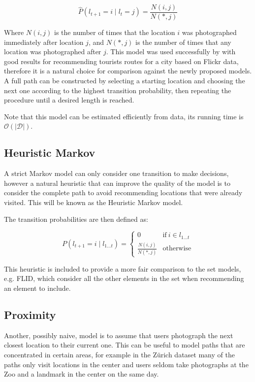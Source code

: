 \begin{equation}
  \hat{P}(l_{t+1} = i \mid l_{t} = j) = \frac{N(i,j)}{N(*,j)}
\end{equation}

Where $N(i,j)$ is the number of times that the location $i$ was photographed immediately after location $j$, and $N(*, j)$ is the number of times that any location was photographed after $j$. This model was used successfully by \citet{Kurashima2010} with good results for recommending tourists routes for a city based on Flickr data, therefore it is a natural choice for comparison against the newly proposed models. A full path can be constructed by selecting a starting location and choosing the next one according to the highest transition probability, then repeating the procedure until a desired length is reached.

Note that this model can be estimated efficiently from data, its running time is $\mathcal{O}(|\mathcal{D}|)$.

\subsection{Heuristic Markov}

A strict Markov model can only consider one transition to make decisions, however a natural heuristic that can improve the quality of the model is to consider the complete path to avoid recommending locations that were already visited. This will be known as the Heuristic Markov model.

The transition probabilities are then defined as:

\begin{equation}
  P(l_{t+1} = i \mid l_{1 \dots t}) = \begin{cases}
  0 & \text{if}\ i \in l_{1 \dots t} \\
  \frac{N(i,j)}{N(*,j)} & \text{otherwise}
  \end{cases}
\end{equation}

This heuristic is included to provide a more fair comparison to the set models, e.g. FLID, which consider all the other elements in the set when recommending an element to include.

\subsection{Proximity}

Another, possibly naive, model is to assume that users photograph the next closest location to their current one. This can be useful to model paths that are concentrated in certain areas, for example in the Zürich dataset many of the paths only visit locations in the center and users seldom take photographs at the Zoo and a landmark in the center on the same day.

